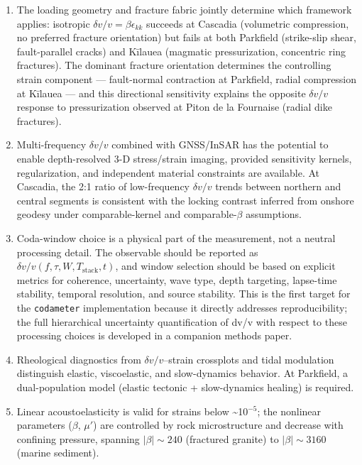 \documentclass[12pt]{article}
\begin{document}
\begin{enumerate}
  was derived for isotropic loading). These results use only published
  measurements; end-to-end validation on independently reprocessed data
  is future work (§10.5). The effective \(|\beta|\) for fractured
  crystalline rock (granite, basalt) clusters around 200--400, while
  unconsolidated marine sediment gives \(|\beta| \sim 3000\).
\item
  The loading geometry and fracture fabric jointly determine which
  framework applies: isotropic \(\delta v/v = \beta\epsilon_{kk}\)
  succeeds at Cascadia (volumetric compression, no preferred fracture
  orientation) but fails at both Parkfield (strike-slip shear,
  fault-parallel cracks) and Kīlauea (magmatic pressurization,
  concentric ring fractures). The dominant fracture orientation
  determines the controlling strain component --- fault-normal
  contraction at Parkfield, radial compression at Kīlauea --- and this
  directional sensitivity explains the opposite \(\delta v/v\) response
  to pressurization observed at Piton de la Fournaise (radial dike
  fractures).
\item
  Multi-frequency \(\delta v/v\) combined with GNSS/InSAR has the
  potential to enable depth-resolved 3-D stress/strain imaging, provided
  sensitivity kernels, regularization, and independent material
  constraints are available. At Cascadia, the 2:1 ratio of low-frequency
  \(\delta v/v\) trends between northern and central segments is
  consistent with the locking contrast inferred from onshore geodesy
  under comparable-kernel and comparable-\(\beta\) assumptions.
\item
  Coda-window choice is a physical part of the measurement, not a
  neutral processing detail. The observable should be reported as
  \(\delta v/v(f,\tau,W,T_{\mathrm{stack}},t)\), and window selection
  should be based on explicit metrics for coherence, uncertainty, wave
  type, depth targeting, lapse-time stability, temporal resolution, and
  source stability. This is the first target for the \texttt{codameter}
  implementation because it directly addresses reproducibility; the full
  hierarchical uncertainty quantification of dv/v with respect to these
  processing choices is developed in a companion methods paper.
\item
  Rheological diagnostics from \(\delta v/v\)--strain crossplots and
  tidal modulation distinguish elastic, viscoelastic, and slow-dynamics
  behavior. At Parkfield, a dual-population model (elastic tectonic +
  slow-dynamics healing) is required.
\item
  Linear acoustoelasticity is valid for strains below
  \textasciitilde{}10\(^{-5}\); the nonlinear parameters (\(\beta\),
  \(\mu'\)) are controlled by rock microstructure and decrease with
  confining pressure, spanning \(|\beta| \sim 240\) (fractured granite)
  to \(|\beta| \sim 3160\) (marine sediment).
\end{enumerate}
\end{document}
